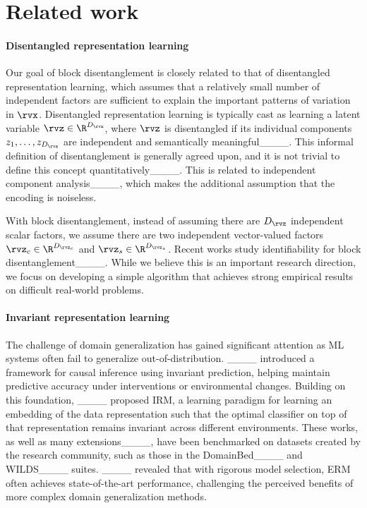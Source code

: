 \section{Related work}
\paragraph{Disentangled representation learning}

Our goal of block disentanglement is closely related to that of disentangled representation learning, which assumes that a relatively small number of independent factors are sufficient to explain the important patterns of variation in $\rvx$. Disentangled representation learning is typically cast as learning a latent variable $\rvz \in \R^{D_\rvz}$, where $\rvz$ is disentangled if its individual components $z_1, \dotsc, z_{D_\rvz}$ are independent and semantically meaningful____. This informal definition of disentanglement is generally agreed upon, and it is not trivial to define this concept quantitatively____. This is related to independent component analysis____, which makes the additional assumption that the encoding is noiseless.

With block disentanglement, instead of assuming there are $D_\rvz$ independent scalar factors, we assume there are two independent vector-valued factors $\rvz_c \in \R^{D_{\rvz_c}}$ and $\rvz_s \in \R^{D_{\rvz_s}}$. Recent works study identifiability for block disentanglement____. While we believe this is an important research direction, we focus on developing a simple algorithm that achieves strong empirical results on difficult real-world problems.

\paragraph{Invariant representation learning}

The challenge of domain generalization has gained significant attention as ML systems often fail to generalize out-of-distribution. ____ introduced a framework for causal inference using invariant prediction, helping maintain predictive accuracy under interventions or environmental changes. Building on this foundation, ____ proposed IRM, a learning paradigm for learning an embedding of the data representation such that the optimal classifier on top of that representation remains invariant across different environments. These works, as well as many extensions____, have been benchmarked on datasets created by the research community, such as those in the DomainBed____ and WILDS____ suites. ____ revealed that with rigorous model selection, ERM often achieves state-of-the-art performance, challenging the perceived benefits of more complex domain generalization methods.